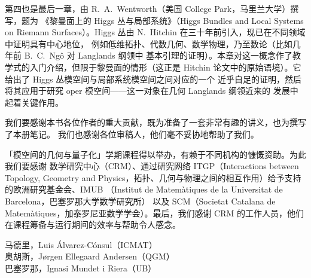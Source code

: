 第四也是最后一章，由 R.~A.~Wentworth（美国 College Park，马里兰大学）撰写，题为
《黎曼面上的 Higgs 丛与局部系统》（Higgs Bundles and Local Systems on Riemann
Surfaces）。Higgs 丛由 N.~Hitchin 在三十年前引入，现已在不同领域中证明具有中心地位，
例如低维拓扑、代数几何、数学物理，乃至数论（比如几年前 B.~C.~Ngô 对 Langlands 纲领中
基本引理的证明）。本章对这一概念作了教学式的入门介绍，但限于黎曼面的情形（这正是
Hitchin 论文中的原始语境）。它给出了 Higgs 丛模空间与局部系统模空间之间对应的一个
近乎自足的证明，然后将其应用于研究 oper 模空间——这一对象在几何 Langlands 纲领近来的
发展中起着关键作用。

我们要感谢本书各位作者的重大贡献，既为准备了一套非常有趣的讲义，也为撰写了本册笔记。
我们也感谢各位审稿人，他们毫不妥协地帮助了我们。

「模空间的几何与量子化」学期课程得以举办，有赖于不同机构的慷慨资助。为此我们要感谢
数学研究中心（CRM）、通过研究网络 ITGP（Interactions between Topology, Geometry
and Physics，拓扑、几何与物理之间的相互作用）给予支持的欧洲研究基金会、IMUB
（Institut de Matemàtiques de la Universitat de Barcelona，巴塞罗那大学数学研究所）
以及 SCM（Societat Catalana de Matemàtiques，加泰罗尼亚数学学会）。最后，我们感谢
CRM 的工作人员，他们在课程筹备与运行期间的效率与帮助令人感念。

\vspace{1.2em}
\begin{flushright}
马德里，Luis Álvarez-Cónsul（ICMAT）\\
奥胡斯，Jørgen Ellegaard Andersen（QGM）\\
巴塞罗那，Ignasi Mundet i Riera（UB）
\end{flushright}
